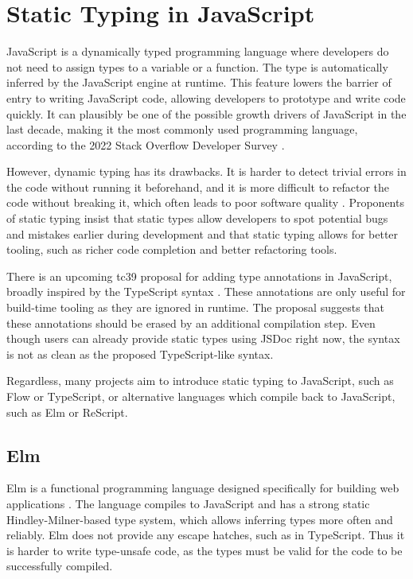 \section{Static Typing in JavaScript}

JavaScript is a dynamically typed programming language where developers do not need to assign types to a variable or a function. The type is automatically inferred by the JavaScript engine at runtime. This feature lowers the barrier of entry to writing JavaScript code, allowing developers to prototype and write code quickly. It can plausibly be one of the possible growth drivers of JavaScript in the last decade, making it the most commonly used programming language, according to the 2022 Stack Overflow Developer Survey \cite{StackOverflowDeveloper}.

However, dynamic typing has its drawbacks. It is harder to detect trivial errors in the code without running it beforehand, and it is more difficult to refactor the code without breaking it, which often leads to poor software quality \cite{schumacherConceptsProgrammingLanguages2015}. Proponents of static typing insist that static types allow developers to spot potential bugs and mistakes earlier during development and that static typing allows for better tooling, such as richer code completion and better refactoring tools.

There is an upcoming \acrshort{tc39} proposal for adding type annotations in JavaScript, broadly inspired by the TypeScript syntax \cite{ECMAScriptProposalType2023}. These annotations are only useful for build-time tooling as they are ignored in runtime. The proposal suggests that these annotations should be erased by an additional compilation step. Even though users can already provide static types using JSDoc right now, the syntax is not as clean as the proposed TypeScript-like syntax.

Regardless, many projects aim to introduce static typing to JavaScript, such as Flow or TypeScript, or alternative languages which compile back to JavaScript, such as Elm or ReScript.

\subsection{Elm}

Elm is a functional programming language designed specifically for building web applications \cite{ElmDelightfulLanguage}. The language compiles to JavaScript and has a strong static Hindley-Milner-based type system, which allows inferring types more often and reliably. Elm does not provide any escape hatches, such as  in TypeScript. Thus it is harder to write type-unsafe code, as the types must be valid for the code to be successfully compiled.

